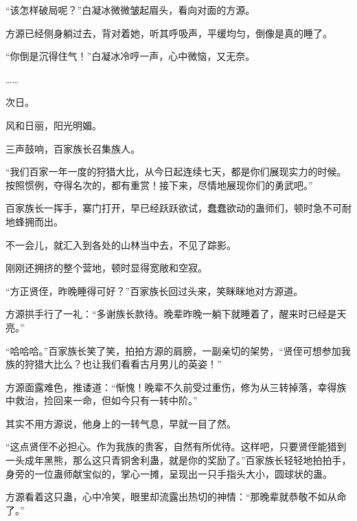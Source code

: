 \begin{this_body}
“该怎样破局呢？”白凝冰微微皱起眉头，看向对面的方源。

方源已经侧身躺过去，背对着她，听其呼吸声，平缓均匀，倒像是真的睡了。

“你倒是沉得住气！”白凝冰冷哼一声，心中微恼，又无奈。

……

次日。

风和日丽，阳光明媚。

三声鼓响，百家族长召集族人。

“我们百家一年一度的狩猎大比，从今日起连续七天，都是你们展现实力的时候。按照惯例，夺得名次的，都有重赏！接下来，尽情地展现你们的勇武吧。”

百家族长一挥手，寨门打开，早已经跃跃欲试，蠢蠢欲动的蛊师们，顿时急不可耐地蜂拥而出。

不一会儿，就汇入到各处的山林当中去，不见了踪影。

刚刚还拥挤的整个营地，顿时显得宽敞和空寂。

“方正贤侄，昨晚睡得可好？”百家族长回过头来，笑眯眯地对方源道。

方源拱手行了一礼：“多谢族长款待。晚辈昨晚一躺下就睡着了，醒来时已经是天亮。”

“哈哈哈。”百家族长笑了笑，拍拍方源的肩膀，一副亲切的架势，“贤侄可想参加我族的狩猎大比么？也让我们看看古月男儿的英姿！”

方源面露难色，推诿道：“惭愧！晚辈不久前受过重伤，修为从三转掉落，幸得族中救治，捡回来一命，但如今只有一转中阶。”

其实不用方源说，他身上的一转气息，早就一目了然。

“这点贤侄不必担心。作为我族的贵客，自然有所优待。这样吧，只要贤侄能猎到一头成年黑熊，那么这只青铜舍利蛊，就是你的奖励了。”百家族长轻轻地拍拍手，身旁的一位蛊师献宝似的，掌心一摊，呈现出一只手指头大小，圆球状的蛊。

方源看着这只蛊，心中冷笑，眼里却流露出热切的神情：“那晚辈就恭敬不如从命了。”

\end{this_body}

